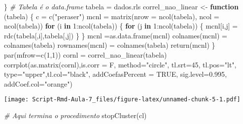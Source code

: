 \documentclass[
]{article}
\newenvironment{Shaded}{\begin{snugshade}}{\end{snugshade}}
\newcommand{\AttributeTok}[1]{\textcolor[rgb]{0.77,0.63,0.00}{#1}}
\newcommand{\CommentTok}[1]{\textcolor[rgb]{0.56,0.35,0.01}{\textit{#1}}}
\newcommand{\ConstantTok}[1]{\textcolor[rgb]{0.00,0.00,0.00}{#1}}
\newcommand{\ControlFlowTok}[1]{\textcolor[rgb]{0.13,0.29,0.53}{\textbf{#1}}}
\newcommand{\DecValTok}[1]{\textcolor[rgb]{0.00,0.00,0.81}{#1}}
\newcommand{\FloatTok}[1]{\textcolor[rgb]{0.00,0.00,0.81}{#1}}
\newcommand{\FunctionTok}[1]{\textcolor[rgb]{0.00,0.00,0.00}{#1}}
\newcommand{\NormalTok}[1]{#1}
\newcommand{\OtherTok}[1]{\textcolor[rgb]{0.56,0.35,0.01}{#1}}
\newcommand{\SpecialCharTok}[1]{\textcolor[rgb]{0.00,0.00,0.00}{#1}}
\newcommand{\StringTok}[1]{\textcolor[rgb]{0.31,0.60,0.02}{#1}}
\begin{document}
\begin{Shaded}
\begin{Highlighting}[]
\NormalTok{\}}
\CommentTok{\# Tabela é o data.frame}
\NormalTok{tabela }\OtherTok{=}\NormalTok{ dados.rls}
\NormalTok{correl\_nao\_linear }\OtherTok{\textless{}{-}} \ControlFlowTok{function}\NormalTok{ (tabela) \{}
\NormalTok{  c }\OtherTok{=} \FunctionTok{c}\NormalTok{(}\StringTok{"peraser"}\NormalTok{)}
\NormalTok{  mcnl }\OtherTok{=} \FunctionTok{matrix}\NormalTok{(}\AttributeTok{nrow =} \FunctionTok{ncol}\NormalTok{(tabela), }\AttributeTok{ncol =} \FunctionTok{ncol}\NormalTok{(tabela))  }
  \ControlFlowTok{for}\NormalTok{ (i }\ControlFlowTok{in} \DecValTok{1}\SpecialCharTok{:}\FunctionTok{ncol}\NormalTok{(tabela)) \{}
    \ControlFlowTok{for}\NormalTok{ (j }\ControlFlowTok{in} \DecValTok{1}\SpecialCharTok{:}\FunctionTok{ncol}\NormalTok{(tabela)) \{}
\NormalTok{      mcnl[i,j] }\OtherTok{=} \FunctionTok{rdc}\NormalTok{(tabela[,i],tabela[,j])}
\NormalTok{    \}}
\NormalTok{  \}}
\NormalTok{  mcnl }\OtherTok{=}\FunctionTok{as.data.frame}\NormalTok{(mcnl)}
  \FunctionTok{colnames}\NormalTok{(mcnl) }\OtherTok{=} \FunctionTok{colnames}\NormalTok{(tabela)}
  \FunctionTok{rownames}\NormalTok{(mcnl) }\OtherTok{=} \FunctionTok{colnames}\NormalTok{(tabela)}
  \FunctionTok{return}\NormalTok{(mcnl)}
\NormalTok{\}}
\FunctionTok{par}\NormalTok{(}\AttributeTok{mfrow=}\FunctionTok{c}\NormalTok{(}\DecValTok{1}\NormalTok{,}\DecValTok{1}\NormalTok{))}
\NormalTok{cornl }\OtherTok{=} \FunctionTok{correl\_nao\_linear}\NormalTok{(tabela)}
\FunctionTok{corrplot}\NormalTok{(}\FunctionTok{as.matrix}\NormalTok{(cornl),}\AttributeTok{is.corr =}\NormalTok{ F, }\AttributeTok{method=}\StringTok{"circle"}\NormalTok{, }\AttributeTok{tl.srt=}\DecValTok{45}\NormalTok{,}
         \AttributeTok{tl.pos=}\StringTok{"lt"}\NormalTok{, }\AttributeTok{type=}\StringTok{"upper"}\NormalTok{,}\AttributeTok{tl.col=}\StringTok{"black"}\NormalTok{, }\AttributeTok{addCoefasPercent =} \ConstantTok{TRUE}\NormalTok{,}
         \AttributeTok{sig.level=}\FloatTok{0.995}\NormalTok{, }\AttributeTok{addCoef.col=}\StringTok{"orange"}\NormalTok{)}
\end{Highlighting}
\end{Shaded}

\texttt{[image: Script-Rmd-Aula-7\_files/figure-latex/unnamed-chunk-5-1.pdf]}

\begin{Shaded}
\begin{Highlighting}[]
\CommentTok{\# Aqui termina o procedimento}
\FunctionTok{stopCluster}\NormalTok{(cl)}
\end{Highlighting}
\end{Shaded}
\end{document}
